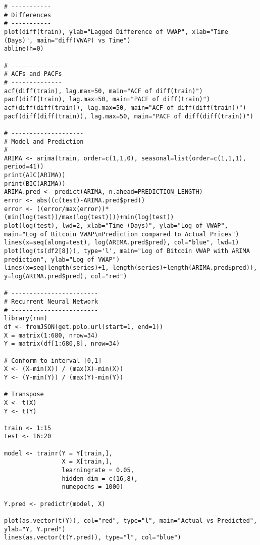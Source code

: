 \begin{verbatim}
# -----------
# Differences
# -----------
plot(diff(train), ylab="Lagged Difference of VWAP", xlab="Time (Days)", main="diff(VWAP) vs Time")
abline(h=0)

# --------------
# ACFs and PACFs
# --------------
acf(diff(train), lag.max=50, main="ACF of diff(train)")
pacf(diff(train), lag.max=50, main="PACF of diff(train)")
acf(diff(diff(train)), lag.max=50, main="ACF of diff(diff(train))")
pacf(diff(diff(train)), lag.max=50, main="PACF of diff(diff(train))")

# --------------------
# Model and Prediction
# --------------------
ARIMA <- arima(train, order=c(1,1,0), seasonal=list(order=c(1,1,1), period=41))
print(AIC(ARIMA))
print(BIC(ARIMA))
ARIMA.pred <- predict(ARIMA, n.ahead=PREDICTION_LENGTH)
error <- abs((c(test)-ARIMA.pred$pred))
error <- ((error/max(error))*(min(log(test))/max(log(test))))+min(log(test))
plot(log(test), lwd=2, xlab="Time (Days)", ylab="Log of VWAP", main="Log of Bitcoin VWAP\nPrediction compared to Actual Prices")
lines(x=seq(along=test), log(ARIMA.pred$pred), col="blue", lwd=1)
plot(log(ts(df2[8])), type='l', main="Log of Bitcoin VWAP with ARIMA prediction", ylab="Log of VWAP")
lines(x=seq(length(series)+1, length(series)+length(ARIMA.pred$pred)), y=log(ARIMA.pred$pred), col="red")

# ------------------------
# Recurrent Neural Network
# ------------------------
library(rnn)
df <- fromJSON(get.polo.url(start=1, end=1))
X = matrix(1:680, nrow=34)
Y = matrix(df[1:680,8], nrow=34)

# Conform to interval [0,1]
X <- (X-min(X)) / (max(X)-min(X))
Y <- (Y-min(Y)) / (max(Y)-min(Y))

# Transpose
X <- t(X)
Y <- t(Y)

train <- 1:15
test <- 16:20

model <- trainr(Y = Y[train,],
                X = X[train,],
                learningrate = 0.05,
                hidden_dim = c(16,8),
                numepochs = 1000)

Y.pred <- predictr(model, X)

plot(as.vector(t(Y)), col="red", type="l", main="Actual vs Predicted", ylab="Y, Y.pred")
lines(as.vector(t(Y.pred)), type="l", col="blue")
\end{verbatim}

